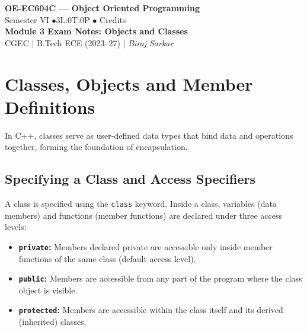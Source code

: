 \documentclass[12pt,a4paper]{article}
\begin{document}

\begin{center}
  {\LARGE\bfseries\color{myred} OE-EC604C --- Object Oriented Programming}\\[5pt]
  {\normalsize\color{mydark} Semester VI \quad$\bullet$\quad 3L:0T:0P \quad$\bullet$ Credits}\\[3pt]
  {\normalsize\color{myteal}\textbf{Module 3 Exam Notes: Objects and Classes}}\\[3pt]
  {\small\color{mydark} CGEC \;$|$\; B.Tech ECE (2023--27) \;$|$\; \textit{Biraj Sarkar}}
\end{center}
\vspace{2pt}
\noindent{\color{myred}\rule{\linewidth}{1.5pt}}
\vspace{2pt}

\hypersetup{linkcolor=mydark}
\tableofcontents
\hypersetup{linkcolor=myteal}
\newpage

\section{Classes, Objects and Member Definitions}

In C++, classes serve as user-defined data types that bind data and operations together, forming the foundation of encapsulation.

\subsection{Specifying a Class and Access Specifiers}
A class is specified using the \texttt{class} keyword. Inside a class, variables (data members) and functions (member functions) are declared under three access levels:
\begin{itemize}[leftmargin=*, itemsep=3pt]
  \item \textbf{\texttt{private}:} Members declared private are accessible only inside member functions of the same class (default access level).
  \item \textbf{\texttt{public}:} Members are accessible from any part of the program where the class object is visible.
  \item \textbf{\texttt{protected}:} Members are accessible within the class itself and its derived (inherited) classes.
\end{itemize}
\end{document}

